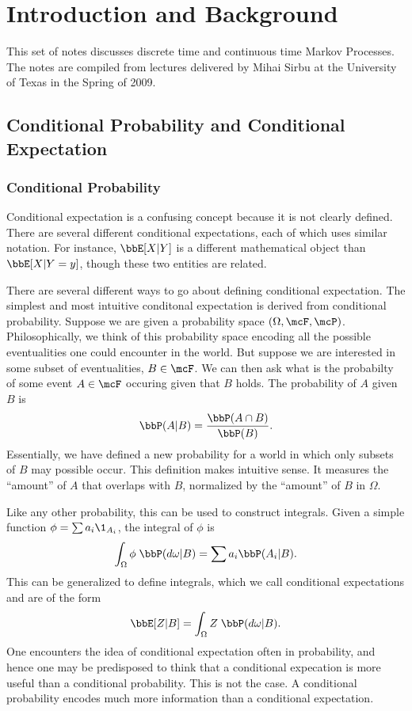 \documentclass{report}
\begin{document}
\large %
\linespread{1.1} %

\setcounter{section}{0}

\tableofcontents

\chapter{Introduction and Background}

This set of notes discusses discrete time and continuous time Markov Processes.  The notes are compiled from lectures delivered by Mihai Sirbu at the University of Texas in the Spring of 2009.

\section{Conditional Probability and Conditional Expectation}

\subsection{Conditional Probability}

Conditional expectation is a confusing concept because it is not clearly defined.  There are several different conditional expectations, each of which uses similar notation.  For instance, $\bbE[X | Y]$ is a different mathematical object than $\bbE[X | Y = y]$, though these two entities are related.

There are several different ways to go about defining conditional expectation.  The simplest and most intuitive conditonal expectation is derived from conditional probability.  Suppose we are given a probability space $(\Omega, \mcF, \mcP)$.  Philosophically, we think of this probability space encoding all the possible eventualities one could encounter in the world.  But suppose we are interested in some subset of eventualities, $B \in \mcF$.  We can then ask what is the probabilty of some event $A \in \mcF$ occuring given that $B$ holds.  The probability of $A$ given $B$ is
\[
\bbP(A | B) = \frac{\bbP(A \cap B)}{\bbP(B)}.
\]
Essentially, we have defined a new probability for a world in which only subsets of $B$ may possible occur.  This definition makes intuitive sense.  It measures the ``amount'' of $A$ that overlaps with $B$, normalized by the ``amount'' of $B$ in $\Omega$.

Like any other probability, this can be used to construct integrals. Given a simple function $\phi = \sum a_i \1_{A_i}$, the integral of $\phi$ is
\[
\int_\Omega \phi \; \bbP(d\omega|B) = \sum a_i \bbP(A_i | B). 
\]
This can be generalized to define integrals, which we call conditional expectations and are of the form
\[
\bbE[Z|B] = \int_\Omega Z \; \bbP(d \omega | B).
\]
One encounters the idea of conditional expectation often in probability, and hence one may be predisposed to think that a conditional expecation is more useful than a conditional probability.  This is not the case.  A conditional probability encodes much more information than a conditional expectation.
\end{document}
